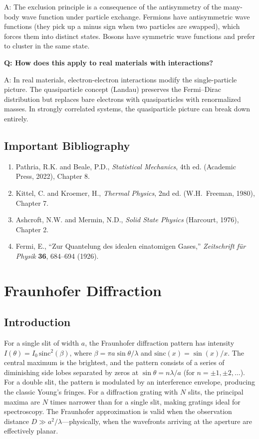 \documentclass[11pt,openright]{book}
\begin{document}
A: The exclusion principle is a consequence of the antisymmetry of the many-body wave function under particle exchange. Fermions have antisymmetric wave functions (they pick up a minus sign when two particles are swapped), which forces them into distinct states. Bosons have symmetric wave functions and prefer to cluster in the same state.

\textbf{Q: How does this apply to real materials with interactions?}

A: In real materials, electron-electron interactions modify the single-particle picture. The quasiparticle concept (Landau) preserves the Fermi--Dirac distribution but replaces bare electrons with quasiparticles with renormalized masses. In strongly correlated systems, the quasiparticle picture can break down entirely.
\section*{Important Bibliography}

\begin{enumerate}
\item Pathria, R.K. and Beale, P.D., \textit{Statistical Mechanics}, 4th ed. (Academic Press, 2022), Chapter 8.
\item Kittel, C. and Kroemer, H., \textit{Thermal Physics}, 2nd ed. (W.H.\ Freeman, 1980), Chapter 7.
\item Ashcroft, N.W. and Mermin, N.D., \textit{Solid State Physics} (Harcourt, 1976), Chapter 2.
\item Fermi, E., ``Zur Quantelung des idealen einatomigen Gases,'' \textit{Zeitschrift f\"ur Physik} \textbf{36}, 684--694 (1926).
\end{enumerate}


\chapter{Fraunhofer Diffraction}

\section*{Introduction}

For a single slit of width $a$, the Fraunhofer diffraction pattern has intensity $I(\theta) = I_0\,\text{sinc}^2(\beta)$, where $\beta = \pi a \sin\theta/\lambda$ and $\text{sinc}(x) = \sin(x)/x$. The central maximum is the brightest, and the pattern consists of a series of diminishing side lobes separated by zeros at $\sin\theta = n\lambda/a$ (for $n = \pm 1, \pm 2, \ldots$). For a double slit, the pattern is modulated by an interference envelope, producing the classic Young's fringes. For a diffraction grating with $N$ slits, the principal maxima are $N$ times narrower than for a single slit, making gratings ideal for spectroscopy. The Fraunhofer approximation is valid when the observation distance $D \gg a^2/\lambda$---physically, when the wavefronts arriving at the aperture are effectively planar.
\end{document}
